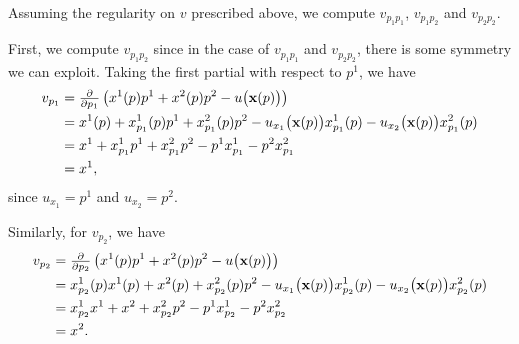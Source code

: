 \begin{solution*}
  Assuming the regularity on \(v\) prescribed above, we compute
  \(v_{p_1p_1}\), \(v_{p_1p_2}\) and \(v_{p_2p_2}\).

  First, we compute \(v_{p_1p_2}\) since in the case of \(v_{p_1p_1}\) and
  \(v_{p_2p_2}\), there is some symmetry we can exploit. Taking the first
  partial with respect to \(p^1\), we have
  \begin{equation}
    \label{eq:4:vp1}
    \begin{aligned}
      v_{p_1} &=\tfrac{\partial}{\partial
        p_1}\left(x^1(p)p^1+x^2(p)p^2-u\bigl(\mathbf{x}(p)\bigr)\right)\\
      &=x^1(p)+x^1_{p_1}(p)p^1+x^2_{p_1}(p)p^2
      -u_{x_1}\bigl(\mathbf{x}(p)\bigr)x^1_{p_1}(p)-u_{x_2}\bigl(\mathbf{x}(p)\bigr)x^2_{p_1}(p)\\
      &=x^1+x^1_{p_1}p^1+x^2_{p_1}p^2-p^1x^1_{p_1}-p^2x^2_{p_1}\\
      &=x^1,
    \end{aligned}
  \end{equation}
  since \(u_{x_1}=p^1\) and \(u_{x_2}=p^2\).

  Similarly, for \(v_{p_2}\), we have
  \begin{equation}
    \label{eq:4:vp2}
    \begin{aligned}
      v_{p_2} &=\tfrac{\partial}{\partial
        p_2}\left(x^1(p)p^1+x^2(p)p^2-u\bigl(\mathbf{x}(p)\bigr)\right)\\
      &=x^1_{p_2}(p)x^1(p)+x^2(p)+x^2_{p_2}(p)p^2
      -u_{x_1}\bigl(\mathbf{x}(p)\bigr)x^1_{p_2}(p)
      -u_{x_2}\bigl(\mathbf{x}(p)\bigr)x^2_{p_2}(p)\\
      &=x^1_{p_2}x^1+x^2+x^2_{p_2}p^2
      -p^1x^1_{p_2}
      -p^2x^2_{p_2}\\
      &=x^2.
    \end{aligned}
  \end{equation}


\end{solution*}
